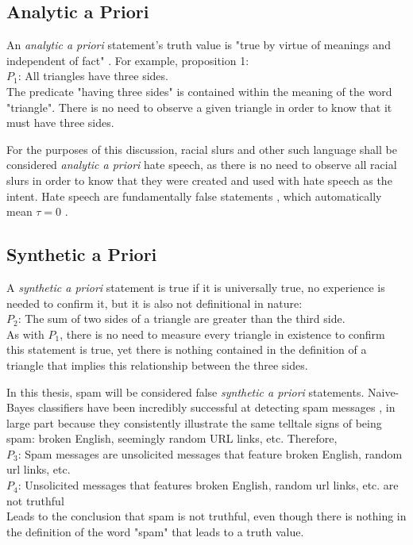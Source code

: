 \documentclass[NETN,manuscript]{stjour-new}
\begin{document}
\subsection{Analytic a Priori}
An \textit{analytic a priori} statement's truth value is "true by virtue of meanings and independent of fact" \citep{quine1951main}. 
For example, proposition 1: \\$P_1$: All triangles have three sides.\\
The predicate "having three sides" is contained within the meaning of the word "triangle". There is no need to observe a given triangle in order to know that it must have three sides.

For the purposes of this discussion, racial slurs and other such language shall be considered \textit{analytic a priori} hate speech, as there is no need to observe all racial slurs in order to know that they were created and used with hate speech as the intent. Hate speech are fundamentally false statements \citep{waldron2012harm}, which automatically mean $\tau = 0$ .

\subsection{Synthetic a Priori}
A \textit{synthetic a priori} statement is true if it is universally true, no experience is needed to confirm it, but it is also not definitional in nature: \\
$P_2$: The sum of two sides of a triangle are greater than the third side. \\
As with $P_1$, there is no need to measure every triangle in existence to confirm this statement is true, yet there is nothing contained in the definition of a triangle that implies this relationship between the three sides.

In this thesis, spam will be considered false \textit{synthetic a priori} statements. Naive-Bayes classifiers have been incredibly successful at detecting spam messages \citep{wang2010detecting,xu2019exploiting,ahmed2018detecting}, in large part because they consistently illustrate the same telltale signs of being spam: broken English, seemingly random URL links, etc. Therefore, \\
$P_3$: Spam messages are unsolicited messages that feature broken English, random url links, etc. \\
$P_4$: Unsolicited messages that features broken English, random url links, etc. are not truthful \\
Leads to the conclusion that spam is not truthful, even though there is nothing in the definition of the word "spam" that leads to a truth value.
\end{document}
